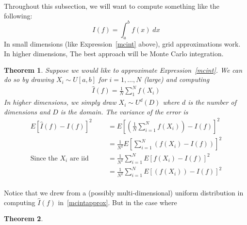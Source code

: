 \documentclass[12pt]{article}
\theoremstyle{plain}
\newtheorem{thm}{Theorem}[section]
\theoremstyle{definition}
\theoremstyle{remark}
\begin{document}
Throughout this subsection, we will want to compute something like the
following:
\begin{equation}
  I(f) = \int^b_a f(x) \; dx
  \label{mcint}
\end{equation}
In small dimensions (like Expression~\ref{mcint} above), grid
approximations work. In higher dimensions, The best approach will be
Monte Carlo integration.

\begin{thm}
Suppose we would like to approximate Expression~\ref{mcint}. We can do so by drawing $X_i \sim U[a,b]$ for $i=1,\ldots,N$ (large) and computing
\begin{align}
  \label{mcintapprox}
  \hat{I}(f) = \frac{1}{N} \sum^N_1 f(X_i)
\end{align}
In higher dimensions, we simply draw $X_i \sim U^d(D)$ where $d$ is the
number of dimensions and $D$ is the domain. The variance of the error is
\begin{align*}
  E[\hat{I}(f) - I(f)]^2
  &= E\left[ \left( \frac{1}{N}\sum^N_{i=1} f(X_i) \right)-I(f)\right]^2\\
  &= \frac{1}{N^2}E\left[ \sum^N_{i=1} \left(f(X_i)-I(f)\right)\right]^2\\
  \text{Since the $X_i$ are iid} \qquad
  &= \frac{1}{N^2}\sum^N_{i=1} E\left[ f(X_i)-I(f)\right]^2\\
  &= \frac{1}{N^2}\sum^N_{i=1} E\left[ \left( f(X_i) \right)- I(f)\right]^2\\
\end{align*}
\end{thm}

Notice that we drew from a (possibly multi-dimensional) uniform
distribution in computing $\hat{I}(f)$ in~\ref{mcintapprox}. But in the
case where 

\begin{thm}
\end{thm}









\end{document}
